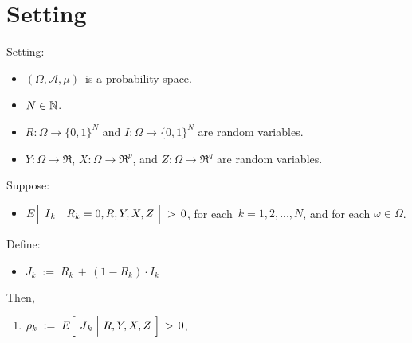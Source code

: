

\section{Setting}
\setcounter{theorem}{0}
\setcounter{equation}{0}


\renewcommand{\theenumi}{\roman{enumi}}
\renewcommand{\labelenumi}{\textnormal{(\theenumi)}$\;\;$}



\begin{proposition}
\mbox{}
\vskip 0.1cm
\noindent
Setting:
\begin{itemize}
\item
	$(\Omega,\mathcal{A},\mu)$\, is a probability space.
\item
	$N \in \mathbb{N}$.
\item
	$R : \Omega \longrightarrow \{0,1\}^{N}$\; and
	$I : \Omega \longrightarrow \{0,1\}^{N}$
	are random variables.
\item
	$Y : \Omega \longrightarrow \Re$,\;
	$X : \Omega \longrightarrow \Re^{p}$,\; and\;
	$Z : \Omega \longrightarrow \Re^{q}$
	are random variables.
\end{itemize}
Suppose:
\begin{itemize}
\item
	$E\!\left[\;\left.\overset{{\color{white}.}}{I}_{k}\;\right\vert\,R_{k}=0,R,Y,X,Z\;\right] \, > \, 0$,\;
	for each \,$k = 1, 2, \ldots, N$, and for each $\omega \in \Omega$.
\end{itemize}
\vskip 0.3cm
\noindent
Define:
\begin{itemize}
\item
	$J_{k} \; := \; R_{k} \, + \, (1-R_{k}) \cdot I_{k}$
\end{itemize}
\vskip 0.3cm
\noindent
Then,
\begin{enumerate}
\item
	$\rho_{k} \; := \; E\!\left[\;\left.\overset{{\color{white}.}}{J}_{k}\;\right\vert\,R,Y,X,Z\;\right] \, > \, 0$,\,

\end{enumerate}
\end{proposition}
